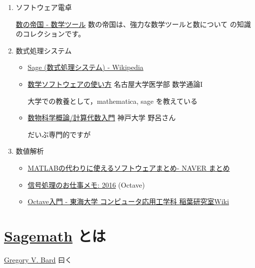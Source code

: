 \documentclass[dvipdfmx,11pt]{jarticle}
\begin{document}
\begin{enumerate}
\item ソフトウェア電卓  

\href{http://ja.numberempire.com/}{数の帝国 - 数学ツール} 数の帝国は、強力な数学ツールと数について
の知識のコレクションです。

\item 数式処理システム

\begin{itemize}
\item \href{https://ja.wikipedia.org/wiki/Sage\_(\%E6\%95\%B0\%E5\%BC\%8F\%E5\%87\%A6\%E7\%90\%86\%E3\%82\%B7\%E3\%82\%B9\%E3\%83\%86\%E3\%83\%A0)}{Sage (数式処理システム) - Wikipedia}

\item \href{https://www.math.nagoya-u.ac.jp/\~naito/lecture/2012\_SS.calc/software-1.pdf}{数学ソフトウェアの使い方} 名古屋大学医学部 数学通論I 

大学での教養として，mathematica, sage を教えている

\item \href{http://www.math.kobe-u.ac.jp/\~noro/subutsu05.pdf}{数物科学概論/計算代数入門} 神戸大学 野呂さん

だいぶ専門的ですが
\end{itemize}

\item 数値解析

\begin{itemize}
\item \href{https://matome.naver.jp/odai/2136163231573327601}{MATLABの代わりに使えるソフトウェアまとめ- NAVER まとめ}

\item \href{http://signalprocessor.blogspot.jp/2016/}{信号処理のお仕事メモ: 2016} (Octave)

\item \href{http://www.inaba-lab.org/wiki/index.php/Octave\%E5\%85\%A5\%E9\%96\%80}{Octave入門 - 東海大学 コンピュータ応用工学科 稲葉研究室Wiki}
\end{itemize}
\end{enumerate}


\section{\href{http://www.sagemath.org}{Sagemath} とは}
\label{sec:orgcea90fb}

\href{http://www.gregorybard.com/Sage.html}{Gregory V. Bard} 曰く
\end{document}

